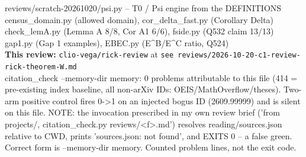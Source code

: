 \documentclass[11pt,a4paper]{article}
\begin{document}
\begin{center}
{{\quad reviews/scratch-20261020/psi.py -- T0 / Psi engine from the DEFINITIONS\\
\quad census\_domain.py (allowed domain), cor\_delta\_fast.py (Corollary Delta)\\
\quad check\_lemA.py (Lemma A 8/8, Cor A1 6/6), fside.py (Q532 claim 13/13)\\
\quad gap1.py (Gap 1 examples), EBEC.py (E\textasciicircum{}B/E\textasciicircum{}C ratio, Q524)\\
[4pt]
\textbf{This review:} \texttt{clio-vega/rick-review} at \texttt{see reviews/2026-10-20-c1-review-rick-theorem-W.md}\\[2pt]
\quad citation\_check --memory-dir memory: 0 problems attributable to this file (414 = pre-existing index baseline, all non-arXiv IDs: OEIS/MathOverflow/theses). Two-arm positive control fires 0->1 on an injected bogus ID (2609.99999) and is silent on this file. NOTE: the invocation prescribed in my own review brief ('from projects/, citation\_check.py reviews/<f>.md') resolves reading/sources.json relative to CWD, prints 'sources.json: not found', and EXITS 0 -- a false green. Correct form is --memory-dir memory. Counted problem lines, not the exit code.
}}
\end{center}
\vfill
\end{document}
